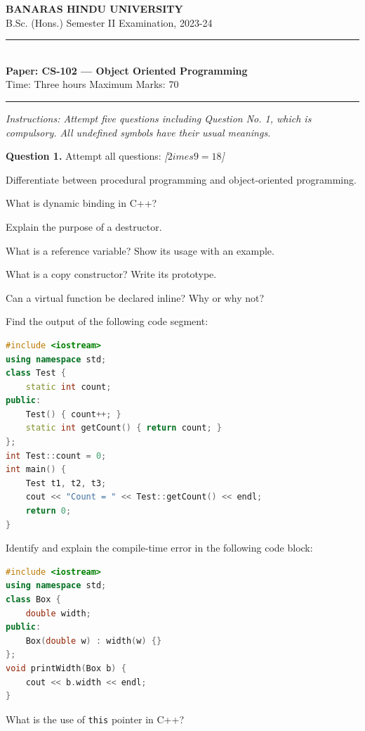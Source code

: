 \documentclass[11pt,a4paper]{article}
\newcommand{\pts}[1]{\hfill   \textit{[#1]}}
\begin{document}
\begin{center}
  {\large\bfseries BANARAS HINDU UNIVERSITY}\\[2pt]
  {\normalsize B.Sc. (Hons.) Semester II Examination, 2023-24}\\[6pt]
  \rule{0.8\linewidth}{0.5pt}\\[6pt]
  {\large\bfseries Paper: CS-102 --- Object Oriented Programming}\\[4pt]
  {\normalsize Time: Three hours \hfill Maximum Marks: 70}
\end{center}

\rule{\linewidth}{0.4pt}

\smallskip



\noindent   \textit{Instructions: Attempt five questions including Question No. 1, which is compulsory. All undefined symbols have their usual meanings.}

\bigskip

\medskip


\noindent   \textbf{Question 1.} Attempt all questions: \pts{$2 imes9=18$}

\begin{parts}
  \item Differentiate between procedural programming and object-oriented programming.
  \item What is dynamic binding in C++?
  \item Explain the purpose of a destructor.
  \item What is a reference variable? Show its usage with an example.
  \item What is a copy constructor? Write its prototype.
  \item Can a virtual function be declared inline? Why or why not?
  \item Find the output of the following code segment:

\begin{lstlisting}[language=C++]
#include <iostream>
using namespace std;
class Test {
    static int count;
public:
    Test() { count++; }
    static int getCount() { return count; }
};
int Test::count = 0;
int main() {
    Test t1, t2, t3;
    cout << "Count = " << Test::getCount() << endl;
    return 0;
}
\end{lstlisting}
  \item Identify and explain the compile-time error in the following code block:

\begin{lstlisting}[language=C++]
#include <iostream>
using namespace std;
class Box {
    double width;
public:
    Box(double w) : width(w) {}
};
void printWidth(Box b) {
    cout << b.width << endl;
}
\end{lstlisting}
  \item What is the use of   \texttt{this} pointer in C++?
\end{parts}
\end{document}
